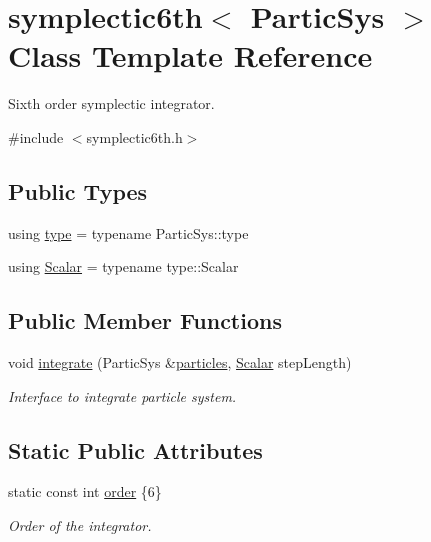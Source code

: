 \hypertarget{classsymplectic6th}{}\section{symplectic6th$<$ Partic\+Sys $>$ Class Template Reference}
\label{classsymplectic6th}


Sixth order symplectic integrator.  




{\ttfamily \#include $<$symplectic6th.\+h$>$}

\subsection*{Public Types}
\begin{DoxyCompactItemize}
\item 
using \mbox{\hyperlink{classsymplectic6th_a8c8736cf1193abff40c406149a32ee78}{type}} = typename Partic\+Sys\+::type
\item 
using \mbox{\hyperlink{classsymplectic6th_a1059d63d55058db7c6ab5b71e097f3ee}{Scalar}} = typename type\+::\+Scalar
\end{DoxyCompactItemize}
\subsection*{Public Member Functions}
\begin{DoxyCompactItemize}
\item 
void \mbox{\hyperlink{classsymplectic6th_ae1e6b8a64e8db932df8e1afb4ff23e0a}{integrate}} (Partic\+Sys \&\mbox{\hyperlink{classparticles}{particles}}, \mbox{\hyperlink{classsymplectic6th_a1059d63d55058db7c6ab5b71e097f3ee}{Scalar}} step\+Length)
\begin{DoxyCompactList}\small\item\em Interface to integrate particle system. \end{DoxyCompactList}\end{DoxyCompactItemize}
\subsection*{Static Public Attributes}
\begin{DoxyCompactItemize}
\item 
static const int \mbox{\hyperlink{classsymplectic6th_a7f4232a8639d27aeb0890476176e8553}{order}} \{6\}
\begin{DoxyCompactList}\small\item\em Order of the integrator. \end{DoxyCompactList}\end{DoxyCompactItemize}


